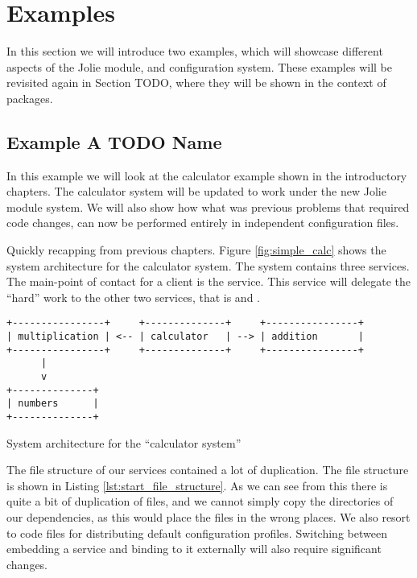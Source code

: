 \section{Examples}
\label{sec:module_examples}

In this section we will introduce two examples, which will showcase different
aspects of the Jolie module, and configuration system. These examples will be
revisited again in Section TODO, where they will be shown in the context of
packages.

\subsection{Example A TODO Name}

In this example we will look at the calculator example shown in the
introductory chapters. The calculator system will be updated to work under the
new Jolie module system. We will also show how what was previous problems that
required code changes, can now be performed entirely in independent
configuration files.

Quickly recapping from previous chapters.  Figure \ref{fig:simple_calc} shows
the system architecture for the calculator system. The system contains three
services. The main-point of contact for a client is the 
service. This service will delegate the ``hard'' work to the other two
services, that is  and .

\begin{listing}[H]
\begin{verbatim}
+----------------+     +--------------+     +----------------+
| multiplication | <-- | calculator   | --> | addition       |
+----------------+     +--------------+     +----------------+
      |
      v
+--------------+
| numbers      |
+--------------+
\end{verbatim}
\caption{System architecture for the ``calculator system''}
\label{fig:simple_calc}
\end{listing}

The file structure of our services contained a lot of duplication. The file
structure is shown in Listing \ref{lst:start_file_structure}. As we can see
from this there is quite a bit of duplication of files, and we cannot simply
copy the directories of our dependencies, as this would place the files in the
wrong places. We also resort to code files for distributing default
configuration profiles. Switching between embedding a service and binding to it
externally will also require significant changes.


